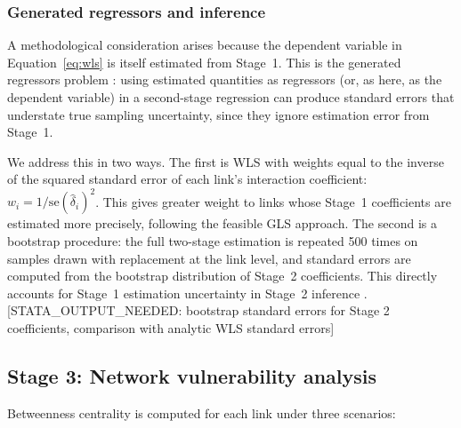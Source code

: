 \documentclass[review]{elsarticle}
\begin{document}
\subsubsection{Generated regressors and inference}

A methodological consideration arises because the dependent variable in Equation~\eqref{eq:wls} is itself estimated from Stage~1. This is the generated regressors problem \citep{pagan1984econometric}: using estimated quantities as regressors (or, as here, as the dependent variable) in a second-stage regression can produce standard errors that understate true sampling uncertainty, since they ignore estimation error from Stage~1.

We address this in two ways. The first is WLS with weights equal to the inverse of the squared standard error of each link's interaction coefficient: $w_i = 1 / \text{se}(\hat{\delta}_i)^2$. This gives greater weight to links whose Stage~1 coefficients are estimated more precisely, following the feasible GLS approach. The second is a bootstrap procedure: the full two-stage estimation is repeated 500 times on samples drawn with replacement at the link level, and standard errors are computed from the bootstrap distribution of Stage~2 coefficients. This directly accounts for Stage~1 estimation uncertainty in Stage~2 inference \citep{murphy1985estimation}. [STATA\_OUTPUT\_NEEDED: bootstrap standard errors for Stage 2 coefficients, comparison with analytic WLS standard errors]


\subsection{Stage 3: Network vulnerability analysis}
\label{sec:method:centrality}

Betweenness centrality \citep{freeman1977centrality} is computed for each link under three scenarios:

\end{document}
